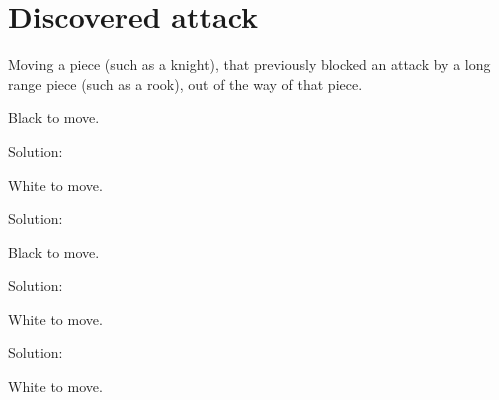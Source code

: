 \documentclass{book}
\begin{document}
\section{Discovered attack}
Moving a piece (such as a knight), that previously blocked an attack by a long range piece (such as a rook), out of the way of that piece.\begin{multicols}{2} 
\begin{samepage} 
\newgame 


 
\showboard
 
 Black to move. 
 
Solution: 
 
\end{samepage}\begin{samepage} 
\newgame 


 
\showboard
 
 White to move. 
 
Solution: 
 
\end{samepage}\begin{samepage} 
\newgame 


 
\showboard
 
 Black to move. 
 
Solution: 
 
\end{samepage}\begin{samepage} 
\newgame 


 
\showboard
 
 White to move. 
 
Solution: 
 
\end{samepage}\begin{samepage} 
\newgame 


 
\showboard
 
 White to move. 
 

\end{samepage}
\end{multicols}
\end{document}
